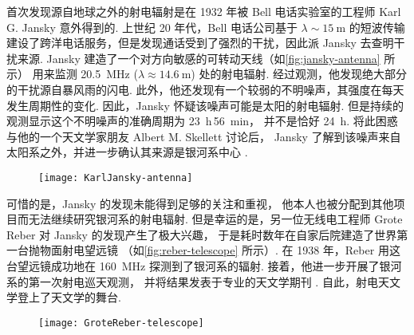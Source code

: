 首次发现源自地球之外的射电辐射是在 1932 年被 Bell 电话实验室的工程师
Karl G. Jansky 意外得到的.
上世纪 20 年代，Bell 电话公司基于 $\lambda \sim \SI{15}{\meter}$
的短波传输建设了跨洋电话服务，但是发现通话受到了强烈的干扰，因此派 Jansky 去查明干扰来源.
Jansky 建造了一个对方向敏感的可转动天线（如\autoref{fig:jansky-antenna} 所示）
用来监测 \SI{20.5}{\MHz} ($\lambda \approx \SI{14.6}{\meter}$) 处的射电辐射.
经过观测，他发现绝大部分的干扰源自暴风雨的闪电.
此外，他还发现有一个较弱的不明噪声，其强度在每天发生周期性的变化.
因此，Jansky 怀疑该噪声可能是太阳的射电辐射.
但是持续的观测显示这个不明噪声的准确周期为 \SI{23}{\hour}\,\SI{56}{\minute}，
并不是恰好 \SI{24}{\hour}.
将此困惑与他的一个天文学家朋友 Albert M. Skellett 讨论后，
Jansky 了解到该噪声来自太阳系之外，并进一步确认其来源是银河系中心 \cite{jansky1933}.

\begin{figure}[htp]
  \centering
  \texttt{[image: KarlJansky-antenna]}
  \label{fig:jansky-antenna}
\end{figure}

可惜的是，Jansky 的发现未能得到足够的关注和重视，
他本人也被分配到其他项目而无法继续研究银河系的射电辐射.
但是幸运的是，另一位无线电工程师 Grote Reber 对 Jansky 的发现产生了极大兴趣，
于是耗时数年在自家后院建造了世界第一台抛物面射电望远镜
（如\autoref{fig:reber-telescope} 所示）.
在 1938 年，Reber 用这台望远镜成功地在 \SI{160}{\MHz} 探测到了银河系的辐射.
接着，他进一步开展了银河系的第一次射电巡天观测，
并将结果发表于专业的天文学期刊 \apj \cite{reber1940}.
自此，射电天文学登上了天文学的舞台.

\begin{figure}[htp]
  \centering
  \texttt{[image: GroteReber-telescope]}
  \label{fig:reber-telescope}
\end{figure}

